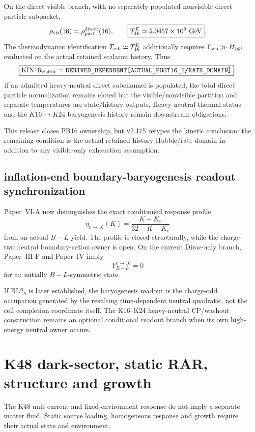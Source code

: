 \documentclass[12pt,a4paper]{article}
\begin{document}
On the direct visible branch, with no separately populated nonvisible direct
particle subpacket,
\[
 \rho_{\rm vis}(16)=\rho_{\rm part}^{\rm direct}(16),
 \qquad
 \boxed{T_{16}^{E}\simeq5.0457\times10^9\ {\rm GeV}}.
\]
The thermodynamic identification $T_{\rm reh}\simeq T_{16}^{E}$ additionally
requires $\Gamma_{\rm vis}\gg H_{16^+}$ evaluated on the actual retained
scalaron history.  Thus
\[
 \boxed{\mathrm{KIN16}_{\rm visible}
 =\texttt{DERIVED\_DEPENDENT[ACTUAL\_POST16\_H/RATE\_DOMAIN]}}.
\]
If an admitted heavy-neutral direct subchannel is populated, the total direct
particle normalization remains closed but the visible/nonvisible partition and
separate temperatures are state/history outputs.  Heavy-neutral thermal status
and the $K16\to K24$ baryogenesis history remain downstream obligations.

This release closes PB16 ownership, but v2.175 retypes the kinetic conclusion:
the remaining condition is the actual retained-history Hubble/rate domain in
addition to any visible-only exhaustion assumption.

\subsection{inflation-end boundary-baryogenesis readout synchronization}
\label{p9:sec:v1102-boundary-baryogenesis-readout-sync}

Paper~VI-A now distinguishes the exact conditioned response profile
\[
 \eta_{e\to16}(K)=\frac{K-K_e}{32-K-K_e}
\]
from an actual $B-L$ yield.  The profile is closed structurally, while the
charge-two neutral boundary-action owner is open.  On the current Dirac-only
branch, Paper~III-F and Paper~IV imply
\[
 \boxed{Y_{B-L}^{e\to16}=0}
\]
for an initially $B-L$-symmetric state.

If $\mathrm{BL2}_{\partial}$ is later established, the baryogenesis readout is
the charge-odd occupation generated by the resulting time-dependent neutral
quadratic, not the cell completion coordinate itself.  The K16--K24
heavy-neutral CP/washout construction remains an optional conditional
readout branch when its own high-energy neutral owner occurs.



\section[K48 dark-sector, static RAR, structure and growth]{K48 dark-sector, static RAR,\\ structure and growth}
\label{p6b:sec:organized-b5}
The K48 unit current and fixed-environment response do not imply a separate matter fluid. Static source loading, homogeneous response and growth require their actual state and environment.
\end{document}
